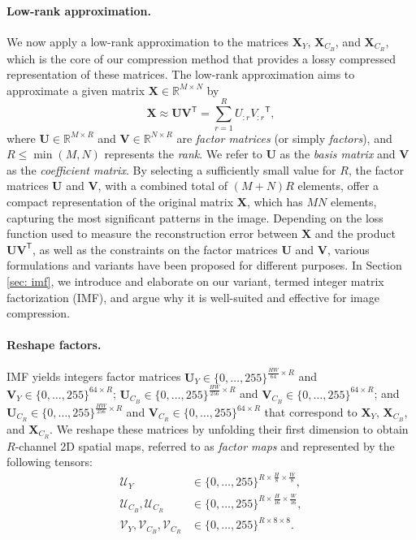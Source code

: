 \paragraph{Low-rank approximation.} 
We now apply a low-rank approximation to the matrices $\bm{X}_{Y}$, $\bm{X}_{C_B}$, and $\bm{X}_{C_R}$, which is the core of our compression method that provides a lossy compressed representation of these matrices.  The low-rank approximation \citep{eckart1936approximation} aims to approximate a given matrix $ \mathbf{X} \in \mathbb{R}^{M \times N} $ by 
\begin{equation} \label{eq: lra}
	\bm{X} \approx \bm{U} \bm{V}^\mathsf{T} = \sum_{r=1}^{R} U_{:r} {V_{:r}}^\mathsf{T},
\end{equation} 
where $\bm{U} \in \mathbb{R}^{M \times R}$ and $\bm{V} \in \mathbb{R}^{N \times R}$ are \emph{factor matrices} (or simply \emph{factors}), and $R \leq \min(M,N)$ represents the \emph{rank}. We refer to $\bm{U}$ as the \emph{basis matrix} and $\bm{V}$ as the \emph{coefficient matrix}. By selecting a sufficiently small value for $R$, the factor matrices $\bm{U}$ and $\bm{V}$, with a combined total of $(M+N)R$ elements, offer a compact representation of the original matrix $\mathbf{X}$, which has $MN$ elements, capturing the most significant patterns in the image. Depending on the loss function used to measure the reconstruction error between $\mathbf{X}$ and the product $\bm{U} \bm{V}^\mathsf{T}$, as well as the constraints on the factor matrices $\bm{U}$ and $\bm{V}$, various formulations and variants have been proposed for different purposes. In Section \ref{sec: imf}, we introduce and elaborate on our variant, termed integer matrix factorization (IMF), and argue why it is well-suited and effective for image compression. 

\paragraph{Reshape factors.} 
IMF yields integers factor matrices $\bm{U}_{Y} \in \{0, \ldots, 255\}^{\frac{HW}{64} \times R}$ and $\bm{V}_{Y} \in \{0, \ldots, 255\}^{64 \times R}$; $\bm{U}_{C_B} \in \{0, \ldots, 255\}^{\frac{HW}{256} \times R}$ and $\bm{V}_{C_B} \in \{0, \ldots, 255\}^{64 \times R}$; and $\bm{U}_{C_R} \in \{0, \ldots, 255\}^{\frac{HW}{256} \times R}$ and $\bm{V}_{C_R} \in \{0, \ldots, 255\}^{64 \times R}$ that correspond to $\bm{X}_{Y}$, $\bm{X}_{C_B}$, and $\bm{X}_{C_R}$. We reshape these matrices by unfolding their first dimension to obtain $R$-channel 2D spatial maps, referred to as \emph{factor maps} and represented by the following tensors:
\begin{align} \label{eq: reshaped factors}
	\bm{\mathcal{U}}_{Y} & \in \{0, \ldots, 255\}^{R \times \frac{H}{8} \times \frac{W}{8}}, \nonumber \\
	\bm{\mathcal{U}}_{C_B}, \bm{\mathcal{U}}_{C_R} & \in \{0, \ldots, 255\}^{R \times \frac{H}{16} \times \frac{W}{16}}, \nonumber \\
	\bm{\mathcal{V}}_{Y}, \bm{\mathcal{V}}_{C_B}, \bm{\mathcal{V}}_{C_R} & \in \{0, \ldots, 255\}^{R \times 8 \times 8}.
\end{align}

